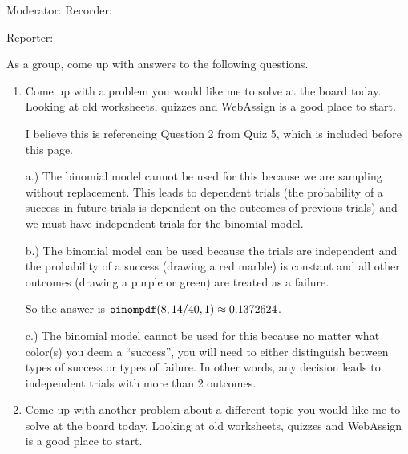 \documentclass{article}
\newcommand{\answer}[1]{\color{red}#1}
\begin{document}
\newpage





\begin{center}
\textbf{}
\end{center}

Moderator:{\underbar{\hspace{2in}}} \hfill  Recorder:{\underbar{\hspace{2in}} 

\bigskip

Reporter:{\underbar{\hspace{2in}}

As a group, come up with answers to the following questions.

\begin{enumerate} 

\item Come up with a problem you would like me to solve at the board today. Looking at old worksheets, quizzes and WebAssign is a good place to start.

{\answer I believe this is referencing Question 2 from Quiz 5, which is included before this page.

a.) The binomial model cannot be used for this because we are sampling without replacement. This leads to dependent trials (the probability of a success in future trials is dependent on the outcomes of previous trials) and we must have independent trials for the binomial model.

b.) The binomial model can be used because the trials are independent and the probability of a success (drawing a red marble) is constant and all other outcomes (drawing a purple or green) are treated as a failure.

So the answer is $\mbox{\texttt{binompdf}}(8, 14/40, 1) \approx 0.1372624$.

c.) The binomial model cannot be used for this because no matter what color(s) you deem a ``success'', you will need to either distinguish between types of success or types of failure. In other words, any decision leads to independent trials with more than 2 outcomes.}

\item Come up with another problem about a different topic you would like me to solve at the board today. Looking at old worksheets, quizzes and WebAssign is a good place to start. 


\end{enumerate}}}
\end{document}
